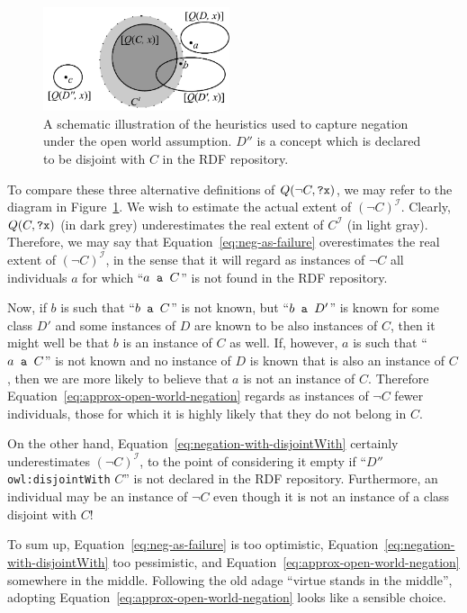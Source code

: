 \documentclass{llncs}
\begin{document}
\begin{figure}[t!]
  \begin{center}
    \includegraphics[height=1.2in]{../negation}
  \end{center}
  \caption{A schematic illustration of the heuristics used to capture negation
    under the open world assumption. $D''$ is a concept which is declared to
    be disjoint with $C$ in the RDF repository.\label{fig:negation}}
\end{figure}

To compare these three alternative definitions of $Q(\neg C, \mbox{\tt ?x})$,
we may refer to the diagram in Figure~\ref{fig:negation}. We wish to estimate
the actual extent of $(\neg C)^\mathcal{I}$. Clearly, $Q(C, \mbox{\tt ?x})$
(in dark grey) underestimates the real extent of $C^\mathcal{I}$ (in light gray).
Therefore, we may say that Equation~\ref{eq:neg-as-failure} overestimates
the real extent of $(\neg C)^\mathcal{I}$,
in the sense that it will regard as instances of $\neg C$ all individuals $a$
for which ``$a \mbox{\tt\ a } C$'' is not found in the RDF repository.

Now, if $b$ is such that ``$b \mbox{\tt\ a } C$'' is not known, but ``$b \mbox{\tt\ a } D'$''
is known for some class $D'$ and some instances of $D$ are known to be also
instances of $C$, then it might well be that $b$ is an instance of $C$ as well.
If, however, $a$ is such that ``$a \mbox{\tt\ a } C$'' is not known and
no instance of $D$ is known that is also an instance of $C$, then we are more
likely to believe that $a$ is not an instance of $C$.
Therefore Equation~\ref{eq:approx-open-world-negation} regards as instances of $\neg C$
fewer individuals, those for which it is highly likely that they do not belong
in $C$.

On the other hand, Equation~\ref{eq:negation-with-disjointWith} certainly underestimates
$(\neg C)^\mathcal{I}$, to the point of considering it empty
if ``$D''$ \texttt{owl:disjointWith} $C$'' is not declared in the RDF repository.
Furthermore, an individual may be an instance of $\neg C$ even though it is not an instance of a class disjoint with $C$!

To sum up, Equation~\ref{eq:neg-as-failure} is too optimistic,
Equation~\ref{eq:negation-with-disjointWith} too pessimistic, and
Equation~\ref{eq:approx-open-world-negation} somewhere in the middle.
Following the old adage ``virtue stands in the middle'', adopting
Equation~\ref{eq:approx-open-world-negation} looks like a sensible choice.
\end{document}
